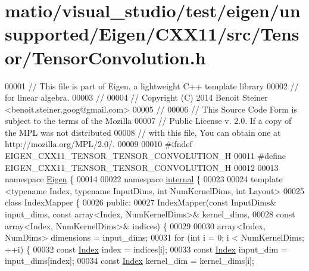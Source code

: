 \hypertarget{matio_2visual__studio_2test_2eigen_2unsupported_2_eigen_2_c_x_x11_2src_2_tensor_2_tensor_convolution_8h_source}{}\section{matio/visual\+\_\+studio/test/eigen/unsupported/\+Eigen/\+C\+X\+X11/src/\+Tensor/\+Tensor\+Convolution.h}
\label{matio_2visual__studio_2test_2eigen_2unsupported_2_eigen_2_c_x_x11_2src_2_tensor_2_tensor_convolution_8h_source}

\begin{DoxyCode}
00001 \textcolor{comment}{// This file is part of Eigen, a lightweight C++ template library}
00002 \textcolor{comment}{// for linear algebra.}
00003 \textcolor{comment}{//}
00004 \textcolor{comment}{// Copyright (C) 2014 Benoit Steiner <benoit.steiner.goog@gmail.com>}
00005 \textcolor{comment}{//}
00006 \textcolor{comment}{// This Source Code Form is subject to the terms of the Mozilla}
00007 \textcolor{comment}{// Public License v. 2.0. If a copy of the MPL was not distributed}
00008 \textcolor{comment}{// with this file, You can obtain one at http://mozilla.org/MPL/2.0/.}
00009 
00010 \textcolor{preprocessor}{#ifndef EIGEN\_CXX11\_TENSOR\_TENSOR\_CONVOLUTION\_H}
00011 \textcolor{preprocessor}{#define EIGEN\_CXX11\_TENSOR\_TENSOR\_CONVOLUTION\_H}
00012 
00013 \textcolor{keyword}{namespace }\hyperlink{namespace_eigen}{Eigen} \{
00014 
00022 \textcolor{keyword}{namespace }\hyperlink{namespaceinternal}{internal} \{
00023 
00024 \textcolor{keyword}{template} <\textcolor{keyword}{typename} Index, \textcolor{keyword}{typename} InputDims, \textcolor{keywordtype}{int} NumKernelDims, \textcolor{keywordtype}{int} Layout>
00025 \textcolor{keyword}{class }IndexMapper \{
00026  \textcolor{keyword}{public}:
00027   IndexMapper(\textcolor{keyword}{const} InputDims& input\_dims, \textcolor{keyword}{const} array<Index, NumKernelDims>& kernel\_dims,
00028               \textcolor{keyword}{const} array<Index, NumKernelDims>& indices) \{
00029 
00030     array<Index, NumDims> dimensions = input\_dims;
00031     \textcolor{keywordflow}{for} (\textcolor{keywordtype}{int} i = 0; i < NumKernelDims; ++i) \{
00032       \textcolor{keyword}{const} \hyperlink{namespace_eigen_a62e77e0933482dafde8fe197d9a2cfde}{Index} index = indices[i];
00033       \textcolor{keyword}{const} \hyperlink{namespace_eigen_a62e77e0933482dafde8fe197d9a2cfde}{Index} input\_dim = input\_dims[index];
00034       \textcolor{keyword}{const} \hyperlink{namespace_eigen_a62e77e0933482dafde8fe197d9a2cfde}{Index} kernel\_dim = kernel\_dims[i];

\end{DoxyCode}
